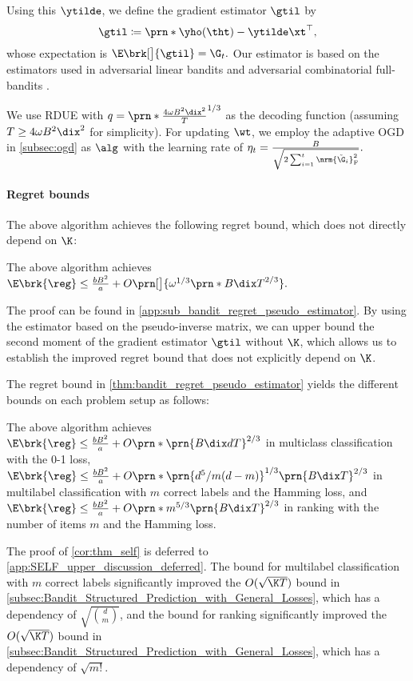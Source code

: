Using this $\ytilde$, we define the gradient estimator $\gtil$ by
\begin{equation}
    \label{eq:gtil_self}
    \gtil\coloneqq\prn*{\yho(\tht)-\ytilde}\xt^\top,
\end{equation}
whose expectation is 
$
    \E\brk[\big]{\gtil}=\G_t.
$
Our estimator is based on the estimators used in adversarial linear bandits and adversarial combinatorial full-bandits \citep{dani07price,abernethy08competing,comband}.  

We use RDUE with $q=\prn*{\frac{4 \omega B^2\dix ^2}{ T }}^{1/3}$ as the decoding function  
(assuming $T \geq 4 \omega B^2\dix ^2$ for simplicity).  
For updating $\wt$, we employ the adaptive OGD in \cref{subsec:ogd} as $\alg$ with the learning rate of 
$
\eta_t=\frac{B}{\sqrt{2 \sum_{i=1}^t\nrm{\tilde{\G}_i}_{\mathrm{F}}^2}}.
$


\paragraph{Regret bounds}
The above algorithm achieves the following regret bound,  
which does not directly depend on $\K$:
\begin{theorem}
    \label{thm:bandit_regret_pseudo_estimator}
    The above algorithm achieves
    $
    \E\brk{\reg}
    \leq
    \frac{bB^2}{a}
    +
    O\prn[\big]{ \omega^{1/3} \prn*{ B \dix T}^{2/3} }.
    $
\end{theorem}
The proof can be found in \cref{app:sub_bandit_regret_pseudo_estimator}.  
By using the estimator based on the pseudo-inverse matrix, 
we can upper bound the second moment of the gradient estimator $\gtil$ without $\K$, which allows us to establish the improved regret bound that does not explicitly depend on $\K$.  

The regret bound in \cref{thm:bandit_regret_pseudo_estimator} yields the different bounds on each problem setup as follows:
\begin{corollary}\label{cor:thm_self}
The above algorithm achieves
$
    \E\brk{\reg}\leq\frac{bB^2}{a}+ O\prn*{ \prn{B \dix  d T}^{2/3}}
$
in multiclass classification with the 0-1 loss,
$
    \E\brk{\reg}\leq\frac{bB^2}{a}
    +
    O\prn*{ \prn{d^5 /m(d-m)}^{1/3} \prn{B \dix T}^{2/3}}
$
in multilabel classification with $m$ correct labels and the Hamming loss,
and 
$
    \E\brk{\reg}\leq\frac{bB^2}{a}+ O \prn*{ m^{5/3}\prn{B\dix T}^{2/3}}
$
in ranking with the number of items $m$ and the Hamming loss.
\end{corollary}
The proof of \cref{cor:thm_self} is deferred to \cref{app:SELF_upper_discussion_deferred}.
The bound for multilabel classification with $m$ correct labels significantly improved the $O(\sqrt{\K T})$ bound in \cref{subsec:Bandit_Structured_Prediction_with_General_Losses},  
which has a dependency of $\sqrt{\binom{d}{m}}$,
and
the bound for ranking significantly improved the $O(\sqrt{\K T})$ bound in \cref{subsec:Bandit_Structured_Prediction_with_General_Losses}, which has a dependency of $\sqrt{m!}$.
